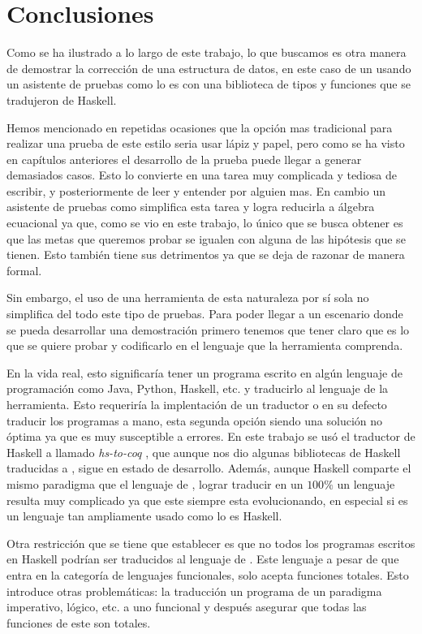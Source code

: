 \chapter*{Conclusiones}
Como se ha ilustrado a lo largo de este trabajo, lo que buscamos es otra manera de demostrar la 
correcci\'on de una estructura de datos, en este caso de un {\arn} usando un asistente de pruebas 
como lo es {\coq} con una biblioteca de tipos y funciones que se tradujeron de Haskell.

Hemos mencionado en repetidas ocasiones que la opci\'on mas tradicional para realizar una prueba de 
este estilo seria usar lápiz y papel, pero como se ha visto en capítulos anteriores el desarrollo de
la prueba puede llegar a generar demasiados casos. Esto lo convierte en una tarea muy complicada y 
tediosa de escribir, y posteriormente de leer y entender por alguien mas. En cambio un asistente de 
pruebas como {\coq} simplifica esta tarea y logra reducirla a álgebra 
ecuacional ya que, como se vio en este trabajo, lo \'unico que se busca obtener es que las metas que 
queremos probar se igualen con alguna de las hip\'otesis que se tienen. Esto también tiene sus 
detrimentos ya que se deja de razonar de manera formal.

Sin embargo, el uso de una herramienta de esta naturaleza por s\'i sola no simplifica del todo este
tipo de pruebas. Para poder llegar a un escenario donde se pueda desarrollar una 
demostraci\'on primero tenemos que tener claro que es lo que se quiere probar y codificarlo en el 
lenguaje que la herramienta comprenda.

En la vida real, esto significaría tener un programa escrito en algún lenguaje de programaci\'on
como Java, Python, Haskell, etc. y traducirlo al lenguaje de la herramienta. Esto requeriría la
implentaci\'on de un traductor o en su defecto traducir los programas a mano, esta segunda opci\'on
siendo una soluci\'on no \'optima ya que es muy susceptible a errores. En este trabajo se us\'o el
traductor de Haskell a {\coq} llamado \textit{hs-to-coq} \cite{thrc}, que aunque nos dio algunas 
bibliotecas de Haskell traducidas a {\coq}, sigue en estado de desarrollo. Adem\'as, aunque Haskell 
comparte el mismo paradigma que el lenguaje de {\coq}, lograr traducir en un $100\%$ un lenguaje 
resulta muy complicado ya que este siempre esta evolucionando, en especial si es un lenguaje tan 
ampliamente usado como lo es Haskell.

Otra restricci\'on que se tiene que establecer es que no todos los programas escritos en Haskell 
podrían ser traducidos al lenguaje de {\coq}. Este lenguaje a pesar de que entra en la categoría de 
lenguajes funcionales, solo acepta funciones totales. Esto introduce otras 
problemáticas: la traducción un programa de un paradigma imperativo, l\'ogico, etc. a uno funcional 
y después asegurar que todas las funciones de este son totales.

